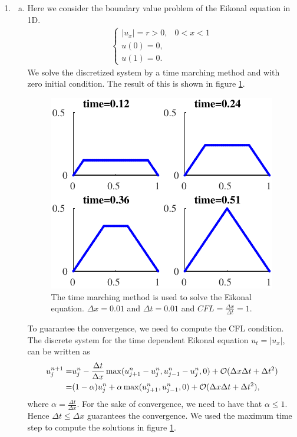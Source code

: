 \documentclass[10pt,a4paper,twoside, french]{article}
\numberwithin{equation}{section}
\numberwithin{figure}{section}
\numberwithin{table}{section}
\begin{document}
\setcounter{section}{1}
\begin{enumerate}
\item \begin{enumerate}[a.]
\item Here we consider the boundary value problem of the Eikonal equation in 1D.
\begin{align*}
\left\{
	\begin{array}{ll}
		|u_x|= r >0, & 0<x<1 \\
		u(0) = 0, \\
		u(1) = 0.
	\end{array}
\right.
\end{align*}
We solve the discretized system by a time marching method and with zero initial condition. The result of this is shown in figure \ref{fig:task1}.
\begin{figure}[h]
\centering
\includegraphics[scale=1.5]{fig/Task1}
\caption{The time marching method is  used to solve the Eikonal equation. $\Delta x=0.01$ and $\Delta t=0.01$ and $CFL=\frac{\Delta x}{\Delta t}=1$.}
\label{fig:task1}
\end{figure}

To guarantee the convergence, we need to compute the CFL condition. The discrete system for the time dependent Eikonal equation $u_t=|u_x|$, can be written as
\begin{align*}
u_j^{n+1}=&u_j^n-\frac{\Delta t}{\Delta x} \max(u_{j+1}^n-u_j^n,u_{j-1}^n-u_j^n,0)+{\cal O}(\Delta x\Delta t+\Delta t^2) \\
=&(1-\alpha)u_j^n+\alpha\max(u_{j+1}^n,u_{j-1}^n,0)+{\cal O}(\Delta x\Delta t+\Delta t^2),
\end{align*}
where $\alpha=\frac{\Delta t}{\Delta x}$. For the sake of convergence, we need to have that $\alpha\leq 1$. Hence $\Delta t\leq  \Delta x$ guarantees the convergence. We used the maximum time step to compute the solutions in figure \ref{fig:task1}.


\end{enumerate}
\end{enumerate}
\end{document}
